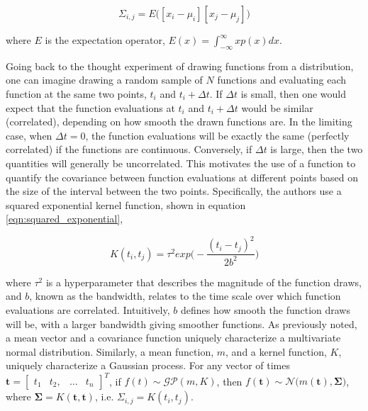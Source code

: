 \documentclass{article}
\begin{document}
 \begin{equation}
  \label{eqn:covariance_matrix}
  \Sigma_{i,j} = E\bigg([x_i- \mu_i][x_j - \mu_j] \bigg)
\end{equation}

\noindent where $E$ is the expectation operator, $E(x) =  \int_{-\infty}^{\infty} xp(x) dx$.




Going back to the thought experiment of drawing functions from a distribution, one can imagine drawing a random sample of $N$ functions and evaluating each function at the same two points, $t_i$ and $t_i + \Delta t$. If $\Delta t$ is small, then one would expect that the function evaluations at $t_i$ and $t_i + \Delta t$ would be similar (correlated), depending on how smooth the drawn functions are. In the limiting case, when $\Delta t = 0$, the function evaluations will be exactly the same (perfectly correlated) if the functions are continuous. Conversely, if $\Delta t$ is large, then the two quantities will generally be uncorrelated. This motivates the use of a function to quantify the covariance between function evaluations at different points based on the size of the interval between the two points. Specifically, the authors use a squared exponential kernel function, shown in equation \ref{eqn:squared_exponential}, 


 \begin{equation}
  \label{eqn:squared_exponential}
    K(t_i, t_j) = \tau^2exp\bigg(-\frac{(t_i-t_j)^2}{2b^2}\bigg)
\end{equation}

\noindent where $\tau^2$ is a hyperparameter that describes the magnitude of the function draws, and $b$, known as the bandwidth, relates to the time scale over which function evaluations are correlated. Intuitively, $b$ defines how smooth the function draws will be, with a larger bandwidth giving smoother functions. As previously noted, a mean vector and a covariance function uniquely characterize a multivariate normal distribution. Similarly, a mean function, $m$, and a kernel function, $K$, uniquely characterize a Gaussian process. For any vector of times $\boldsymbol{t} = \begin{bmatrix}  t_1 & t_2, & \ldots & t_n \end{bmatrix}^T$, if $f(t) \sim \mathcal{GP}(m,K)$, then $f(\boldsymbol{t}) \sim \mathcal{N}\Big(m(\boldsymbol{t}), \boldsymbol{\Sigma}\Big)$, where $\boldsymbol{\Sigma} =  K(\boldsymbol{t},\boldsymbol{t})$, i.e. $\Sigma_{i,j} = K(t_i, t_j)$. 
\end{document}

